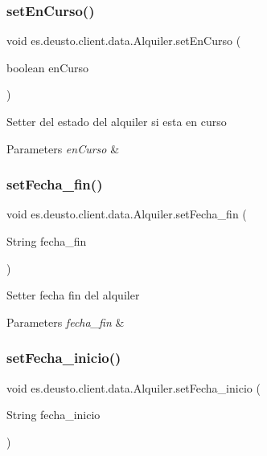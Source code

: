 \subsubsection{\texorpdfstring{setEnCurso()}{setEnCurso()}}
{\footnotesize\ttfamily void es.\+deusto.\+client.\+data.\+Alquiler.\+set\+En\+Curso (\begin{DoxyParamCaption}\item[{boolean}]{en\+Curso }\end{DoxyParamCaption})}

Setter del estado del alquiler si esta en curso 
\begin{DoxyParams}{Parameters}
{\em en\+Curso} & \\
\hline
\end{DoxyParams}
\mbox{\label{classes_1_1deusto_1_1client_1_1data_1_1_alquiler_a5d6ba9ac126d41d43ab08f02d25c5c07}} 
\subsubsection{\texorpdfstring{setFecha\_fin()}{setFecha\_fin()}}
{\footnotesize\ttfamily void es.\+deusto.\+client.\+data.\+Alquiler.\+set\+Fecha\+\_\+fin (\begin{DoxyParamCaption}\item[{String}]{fecha\+\_\+fin }\end{DoxyParamCaption})}

Setter fecha fin del alquiler 
\begin{DoxyParams}{Parameters}
{\em fecha\+\_\+fin} & \\
\hline
\end{DoxyParams}
\mbox{\label{classes_1_1deusto_1_1client_1_1data_1_1_alquiler_a2821cd543f5cb7cf7ba720103b16a21a}} 
\subsubsection{\texorpdfstring{setFecha\_inicio()}{setFecha\_inicio()}}
{\footnotesize\ttfamily void es.\+deusto.\+client.\+data.\+Alquiler.\+set\+Fecha\+\_\+inicio (\begin{DoxyParamCaption}\item[{String}]{fecha\+\_\+inicio }\end{DoxyParamCaption})}

